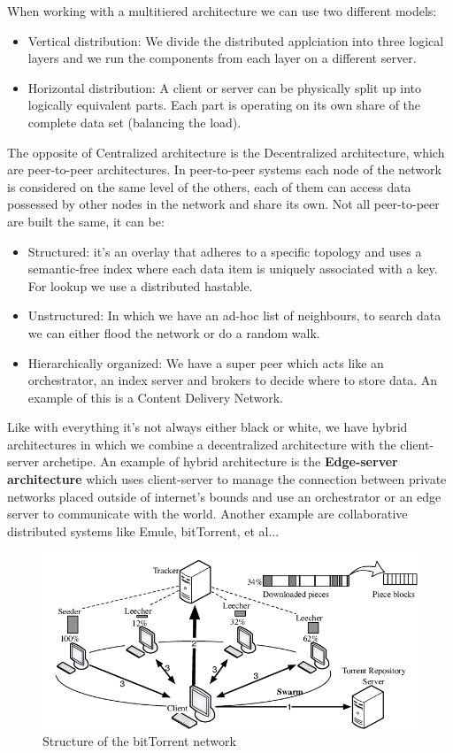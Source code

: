 When working with a multitiered architecture we can use two different models:
\begin{itemize}
    \item Vertical distribution: We divide the distributed applciation into three logical layers and we run the components from each layer on a different server.
    \item Horizontal distribution: A client or server can be physically split up into logically equivalent parts. Each part is operating on its own share of the complete data set (balancing the load).
\end{itemize}
The opposite of Centralized architecture is the Decentralized architecture, which are peer-to-peer architectures. \n
In peer-to-peer systems each node of the network is considered on the same level of the others, each of them can access data possessed by other nodes in the network and share its own. Not all peer-to-peer are built the same, it can be:
\begin{itemize}
    \item Structured: it's an overlay that adheres to a specific topology and uses a semantic-free index where each data item is uniquely associated with a key. For lookup we use a distributed hastable.
    \item Unstructured: In which we have an ad-hoc list of neighbours, to search data we can either flood the network or do a random walk.
    \item Hierarchically organized: We have a super peer which acts like an orchestrator, an index server and brokers to decide where to store data. An example of this is a Content Delivery Network.
\end{itemize}
Like with everything it's not always either black or white, we have hybrid architectures in which we combine a decentralized architecture with the client-server archetipe. \n
An example of hybrid architecture is the \textbf{Edge-server architecture} which uses client-server to manage the connection between private networks placed outside of internet's bounds and use an orchestrator or an edge server to communicate with the world. \n
Another example are collaborative distributed systems like Emule, bitTorrent, et al...
\begin{figure}[htb]
    \centering
    \includegraphics[scale=0.45]{img/bittorrent.png}
    \caption{Structure of the bitTorrent network}
\end{figure}
